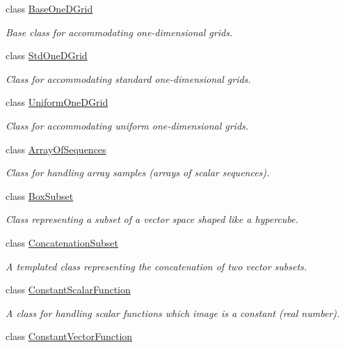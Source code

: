 \begin{DoxyCompactItemize}
class \hyperlink{class_q_u_e_s_o_1_1_base_one_d_grid}{Base\-One\-D\-Grid}
\begin{DoxyCompactList}\small\item\em Base class for accommodating one-\/dimensional grids. \end{DoxyCompactList}\item 
class \hyperlink{class_q_u_e_s_o_1_1_std_one_d_grid}{Std\-One\-D\-Grid}
\begin{DoxyCompactList}\small\item\em Class for accommodating standard one-\/dimensional grids. \end{DoxyCompactList}\item 
class \hyperlink{class_q_u_e_s_o_1_1_uniform_one_d_grid}{Uniform\-One\-D\-Grid}
\begin{DoxyCompactList}\small\item\em Class for accommodating uniform one-\/dimensional grids. \end{DoxyCompactList}\item 
class \hyperlink{class_q_u_e_s_o_1_1_array_of_sequences}{Array\-Of\-Sequences}
\begin{DoxyCompactList}\small\item\em Class for handling array samples (arrays of scalar sequences). \end{DoxyCompactList}\item 
class \hyperlink{class_q_u_e_s_o_1_1_box_subset}{Box\-Subset}
\begin{DoxyCompactList}\small\item\em Class representing a subset of a vector space shaped like a hypercube. \end{DoxyCompactList}\item 
class \hyperlink{class_q_u_e_s_o_1_1_concatenation_subset}{Concatenation\-Subset}
\begin{DoxyCompactList}\small\item\em A templated class representing the concatenation of two vector subsets. \end{DoxyCompactList}\item 
class \hyperlink{class_q_u_e_s_o_1_1_constant_scalar_function}{Constant\-Scalar\-Function}
\begin{DoxyCompactList}\small\item\em A class for handling scalar functions which image is a constant (real number). \end{DoxyCompactList}\item 
class \hyperlink{class_q_u_e_s_o_1_1_constant_vector_function}{Constant\-Vector\-Function}

\end{DoxyCompactItemize}
